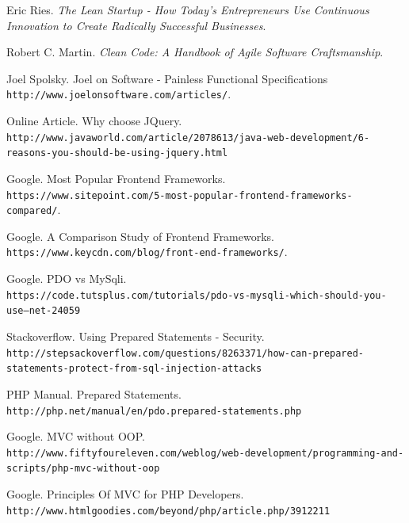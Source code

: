 \begin{thebibliography}{9}

\newcommand{\smallurl}[1]{{\footnotesize \texttt{#1}}}

Eric Ries. 
\textit{The Lean Startup - How Today's Entrepreneurs Use Continuous Innovation to Create Radically Successful Businesses}. 
 
Robert C. Martin.
\textit{Clean Code: A Handbook of Agile Software Craftsmanship}.

\bibitem{} 
Joel Spolsky. Joel on Software - Painless Functional Specifications
\\\texttt{http://www.joelonsoftware.com/articles/}.

\bibitem{} 
Online Article. Why choose JQuery.
\\\smallurl{http://www.javaworld.com/article/2078613/java-web-development/6-reasons-you-should-be-using-jquery.html}

\bibitem{} 
Google. Most Popular Frontend Frameworks.
\\\texttt{https://www.sitepoint.com/5-most-popular-frontend-frameworks-compared/}.

\bibitem{} 
Google. A Comparison Study of Frontend Frameworks.
\\\texttt{https://www.keycdn.com/blog/front-end-frameworks/}.

\bibitem{} 
Google. PDO vs MySqli.
\\\smallurl{https://code.tutsplus.com/tutorials/pdo-vs-mysqli-which-should-you-use--net-24059}

\bibitem{} 
Stackoverflow. Using Prepared Statements - Security.
\\\smallurl{http://stepsackoverflow.com/questions/8263371/how-can-prepared-statements-protect-from-sql-injection-attacks}

\bibitem{} 
PHP Manual. Prepared Statements.
\\\texttt{http://php.net/manual/en/pdo.prepared-statements.php}

\bibitem{} 
Google. MVC without OOP.
\\\texttt{http://www.fiftyfoureleven.com/weblog/web-development/programming-and-scripts/php-mvc-without-oop}


\bibitem{} 
Google. Principles Of MVC for PHP Developers.
\\\texttt{http://www.htmlgoodies.com/beyond/php/article.php/3912211}

\end{thebibliography}













 












